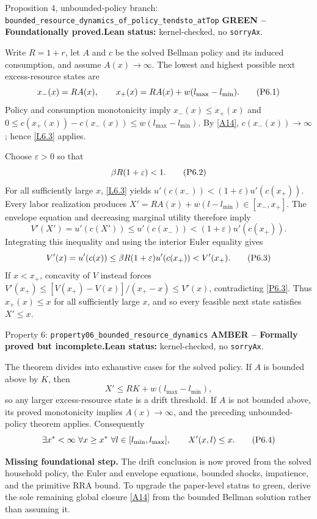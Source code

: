 \documentclass[11pt]{article}
\newcommand{\leanname}[1]{\nolinkurl{#1}}
\newcommand{\eqP}[1]{\refstepcounter{equation}\tag{P#1}}
\newcommand{\formalcheck}{\textbf{Lean status:} kernel-checked, no \texttt{sorryAx}.}
\newcommand{\missing}[1]{\par\smallskip\textbf{Missing foundational step.} #1}
\newcommand{\greenstatus}{\textcolor{proved}{\textbf{GREEN -- Foundationally proved.}}}
\newcommand{\amberstatus}{\textcolor{conditional}{\textbf{AMBER -- Formally proved but incomplete.}}}
\begin{document}
\begin{greenbox}{Proposition 4, unbounded-policy branch:
\leanname{bounded_resource_dynamics_of_policy_tendsto_atTop}}
\greenstatus\quad\formalcheck

Write $R=1+r$, let $A$ and $c$ be the solved Bellman policy and its induced
consumption, and assume $A(x)\to\infty$.  The lowest and highest possible next
excess-resource states are
\begin{equation}
 x_-(x)=R A(x),\qquad
 x_+(x)=R A(x)+w(l_{\max}-l_{\min}).
 \eqP{6.1}\label{P6.1}
\end{equation}
Policy and consumption monotonicity imply
$x_-(x)\le x_+(x)$ and
$0\le c(x_+(x))-c(x_-(x))\le w(l_{\max}-l_{\min})$.
By \eqref{A14}, $c(x_-(x))\to\infty$; hence \eqref{L6.3} applies.

Choose $\varepsilon>0$ so that
\begin{equation}
 \beta R(1+\varepsilon)<1. \eqP{6.2}\label{P6.2}
\end{equation}
For all sufficiently large $x$, \eqref{L6.3} yields
$u'(c(x_-))<(1+\varepsilon)u'(c(x_+))$.  Every labor realization produces
$X'=RA(x)+w(l-l_{\min})\in[x_-,x_+]$.  The envelope equation and decreasing
marginal utility therefore imply
\[
 V'(X')=u'(c(X'))\le u'(c(x_-))
 <(1+\varepsilon)u'(c(x_+)).
\]
Integrating this inequality and using the interior Euler equality gives
\begin{equation}
 V'(x)=u'(c(x))
 \le\beta R(1+\varepsilon)u'(c(x_+))<V'(x_+).
 \eqP{6.3}\label{P6.3}
\end{equation}
If $x<x_+$, concavity of $V$ instead forces
$V'(x_+)\le [V(x_+)-V(x)]/(x_+-x)\le V'(x)$, contradicting
\eqref{P6.3}.  Thus $x_+(x)\le x$ for all sufficiently large $x$, and so
every feasible next state satisfies $X'\le x$.
\end{greenbox}

\begin{amberbox}{Property 6: \leanname{property06_bounded_resource_dynamics}}
\amberstatus\quad\formalcheck

The theorem divides into exhaustive cases for the solved policy.  If
$A$ is bounded above by $K$, then
\[
 X'\le RK+w(l_{\max}-l_{\min}),
\]
so any larger excess-resource state is a drift threshold.  If $A$ is not
bounded above, its proved monotonicity implies $A(x)\to\infty$, and the
preceding unbounded-policy theorem applies.  Consequently
\begin{equation}
 \exists x^*<\infty\ \forall x\ge x^*\ \forall l\in[l_{\min},l_{\max}],
 \qquad X'(x,l)\le x. \eqP{6.4}\label{P6.4}
\end{equation}

\missing{The drift conclusion is now proved from the solved household policy,
the Euler and envelope equations, bounded shocks, impatience, and the primitive
RRA bound.  To upgrade the paper-level status to green, derive the sole
remaining global closure \eqref{A14} from the bounded Bellman solution rather
than assuming it.}
\end{amberbox}
\end{document}
